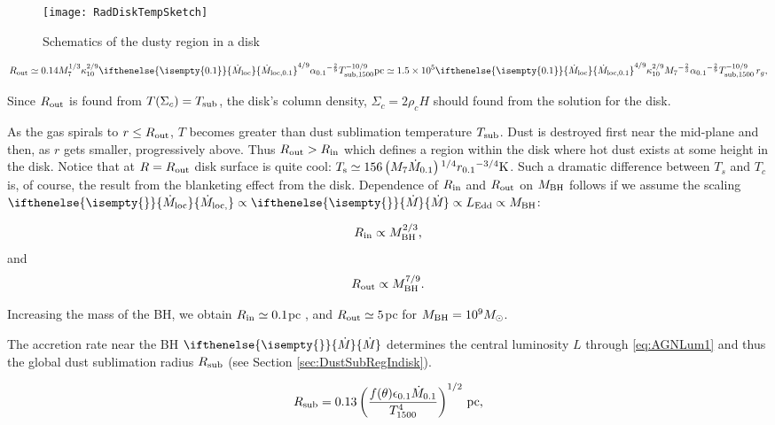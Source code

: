 \documentclass[12pt,english,preprint]{aastex}
\newcommand{\su}[2]{#1_{\rm #2}}
\newcommand{\mdt}[1][]{ 
  \ifthenelse{\isempty{#1}}
  {\dot{M}_{\rm loc}}
  { {\dot M}_{\rm{loc},{#1}} } 
  } %
\newcommand{\Mdt}[1][]{ 
    \ifthenelse{\isempty{#1}}
    {\dot{M}_{}}
    { {\dot M}_{{#1}} } 
} %
\newcommand{\Rout}{\su{R}{out}}
\newcommand{\rsub}{ \su{R}{sub} }
\newcommand{\Tsub}{ \su{T}{sub} }
\newcommand{\Tc}{T}
\begin{document}
\begin{figure} 
\texttt{[image: RadDiskTempSketch]}
\caption{Schematics of the dusty region in a disk}
\label{fig:TSurfVsTcVsTsubSketch}
\end{figure}
  


\begin{equation}
\su{R}{out}\simeq0.14M_{7}^{1/3}\kappa_{10}^{2/9}
\mdt[0.1]^{4/9}
\alpha_{0.1}{}^{-\frac{2}{9}}\su{T}{sub,1500}^{-10/9}{\rm pc}\simeq
1.5\times10^{5}\mdt[0.1]^{4/9}\kappa_{10}^{2/9}M_{7}{}^
{-\frac{2}{3}}\alpha_{0.1}{}^{-\frac{2}{9}}\su{T}{sub,1500}^{-10/9}\,r_g\mbox{,}\label{eq:Rout}
\end{equation}

\noindent Since $\su{R}{out}$ is found from $T(\Sigma_c) = \Tsub$, 
the disk's column density, $\Sigma_c = 2\rho_c H$  
should found from the solution for the disk.

As the gas spirals to $r\le \Rout$, $\Tc$ becomes greater
than dust sublimation temperature $T_{{\rm sub}}$. Dust is destroyed
first near the mid-plane and then, as $r$ gets smaller, progressively
above. Thus $R_{{\rm out}}>R_{{\rm in}}$ which  defines a region
within the disk where hot dust exists at some height in the disk. Notice that at $R=R_{{\rm out}}$
disk surface is quite cool: $T_{{\rm s}}\simeq156\left(M_{7}\dot{M}_{0.1}\right){}^{1/4}r_{0.1}{}^{-3/4}{\rm K}$.
Such a dramatic difference between $T_s$ and $T_c$ is, of course, the 
result from the blanketing effect from the disk.
Dependence of $\su{R}{in}$ and $\su{R}{out}$ on $\su{M}{BH}$ follows 
if we assume the scaling $\mdt\propto\Mdt\propto \su{L}{Edd} \propto \su{M}{BH}$:

\begin{equation}
\su{R}{in}\propto \su{M}{BH}^{2/3} \mbox{,}
\end{equation}
and
\begin{equation}
\su{R}{out}\propto \su{M}{BH}^{7/9}\mbox{.}
\end{equation}

\noindent Increasing the mass of the BH, we obtain $R_{{\rm in}}\simeq0.1$pc , and $R_{{\rm out}}\simeq5$pc 
for $M_{{\rm BH}}=10^{9}M_{\odot}$.


The accretion rate near the BH $\Mdt$ determines the central luminosity  $L$ through \eqref{eq:AGNLum1} and thus the global dust sublimation radius $\rsub$ 
(see Section \ref{sec:DustSubRegIndisk}). 

\begin{equation}\label{eq:RsubAGN}
  \su{R}{sub}=0.13\left(\frac{f(\theta)\epsilon_{0.1}{\dot{M}}_{0.1}}{T_{1500}^{4}}\right)^{1/2}\,\text{pc}\mbox{,}
\end{equation}
\end{document}
